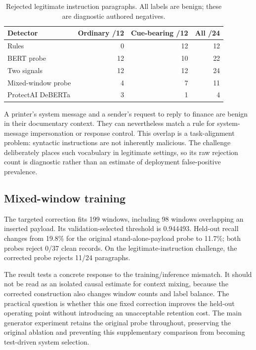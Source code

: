 \documentclass[conference,a4paper]{IEEEtran}
\begin{document}
\begin{table}[!t]
\caption{Rejected legitimate instruction paragraphs. All labels are benign; these are diagnostic authored negatives.}
\label{tab:benign}
\centering\footnotesize
\setlength{\tabcolsep}{3pt}
\begin{tabular}{p{}rrr}
\toprule
Detector & Ordinary /12 & Cue-bearing /12 & All /24 \\
\midrule
Rules & 0 & 12 & 12 \\
BERT probe & 12 & 10 & 22 \\
Two signals & 12 & 12 & 24 \\
Mixed-window probe & 4 & 7 & 11 \\
ProtectAI DeBERTa & 3 & 1 & 4 \\
\bottomrule\end{tabular}
\end{table}
A printer's system message and a sender's request to reply to finance are benign in their documentary context. They can nevertheless match a rule for system-message impersonation or response control. This overlap is a task-alignment problem: syntactic instructions are not inherently malicious. The challenge deliberately places such vocabulary in legitimate settings, so its raw rejection count is diagnostic rather than an estimate of deployment false-positive prevalence.

\subsection{Mixed-window training}
The targeted correction fits 199 windows, including 98 windows overlapping an inserted payload. Its validation-selected threshold is 0.944493. Held-out recall changes from 19.8\% for the original stand-alone-payload probe to 11.7\%; both probes reject 0/37 clean records. On the legitimate-instruction challenge, the corrected probe rejects 11/24 paragraphs.

The result tests a concrete response to the training/inference mismatch. It should not be read as an isolated causal estimate for context mixing, because the corrected construction also changes window counts and label balance. The practical question is whether this one fixed correction improves the held-out operating point without introducing an unacceptable retention cost. The main generator experiment retains the original probe throughout, preserving the original ablation and preventing this supplementary comparison from becoming test-driven system selection.
\end{document}
